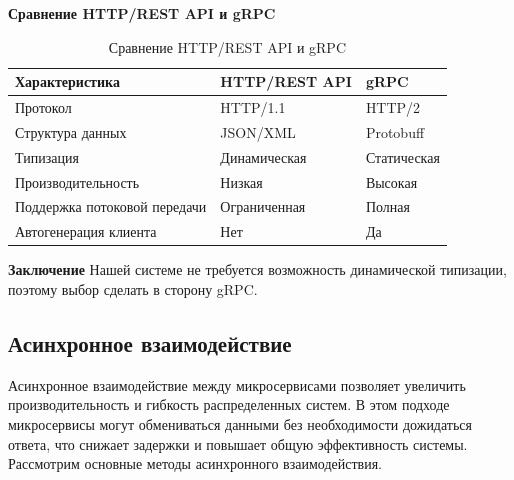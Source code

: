 \textbf{Сравнение HTTP/REST API и gRPC}
\begin{table}[h]
    \centering
    \caption{Сравнение HTTP/REST API и gRPC}
    \begin{tabular}{|l|l|l|}
        \hline
        \textbf{Характеристика}           & \textbf{HTTP/REST API}                          & \textbf{gRPC}                                     \\ \hline
        Протокол                  & HTTP/1.1            & HTTP/2                             \\ \hline
        Структура данных          & JSON/XML                        & Protobuff \\ \hline
        Типизация                 & Динамическая            & Статическая  \\ \hline
        Производительность         & Низкая         & Высокая \\ \hline
        Поддержка потоковой передачи & Ограниченная                                & Полная \\ \hline
        Автогенерация клиента     & Нет & Да \\ \hline
    \end{tabular}
\end{table}


\textbf{Заключение}
Нашей системе не требуется возможность динамической типизации, поэтому выбор сделать в сторону gRPC.

\subsection{Асинхронное взаимодействие} %

Асинхронное взаимодействие между микросервисами позволяет увеличить производительность и гибкость распределенных систем. В этом подходе микросервисы могут обмениваться данными без необходимости дожидаться ответа, что снижает задержки и повышает общую эффективность системы. Рассмотрим основные методы асинхронного взаимодействия.

